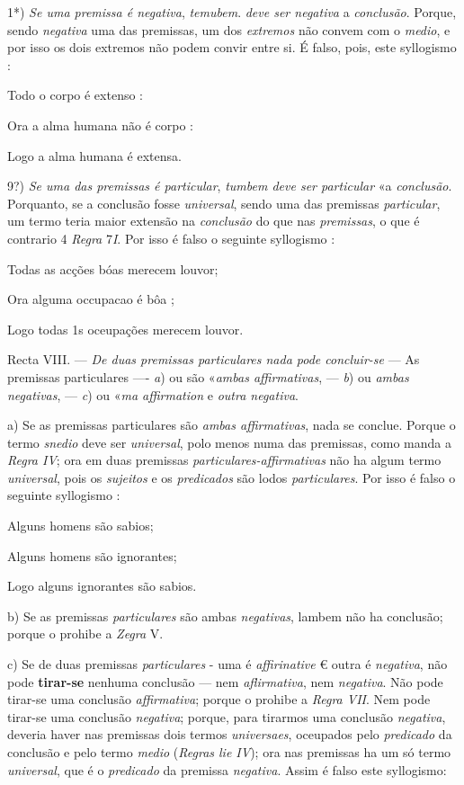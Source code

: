 1*) \emph{Se uma premissa é negativa}, \emph{temubem}. \emph{deve ser negativa} a \emph{conclusão}. Porque, sendo \emph{negativa} uma das premissas, um dos \emph{extremos} não convem com o \emph{medio}, e por isso os dois extremos não podem convir entre si. É falso, pois, este syllogismo :

Todo o corpo é extenso :

Ora a alma humana não é corpo :

Logo a alma humana é extensa.

9?) \emph{Se uma das premissas é particular}, \emph{tumbem deve ser particular} «a \emph{conclusão}. Porquanto, se a conclusão fosse \emph{universal}, sendo uma das premissas \emph{particular}, um termo teria maior extensão na \emph{conclusão} do que nas \emph{premissas}, o que é contrario 4 \emph{Regra} 7\emph{I}. Por isso é falso o seguinte syllogismo :

Todas as acções bóas merecem louvor;

Ora alguma occupacao é bôa ;

Logo todas 1s oceupações merecem louvor.

Recta VIII. --- \emph{De duas premissas particulares nada pode concluir-se} --- As premissas particulares ---- \emph{a}) ou são «\emph{ambas affirmativas}, --- \emph{b}) ou \emph{ambas negativas}, --- \emph{c}) ou «\emph{ma affirmation} e \emph{outra negativa}.

 a) Se as premissas particulares são \emph{ambas affirmativas}, nada se conclue. Porque o termo \emph{snedio} deve ser \emph{universal}, polo menos numa das premissas, como manda a \emph{Regra IV}; ora em duas premissas \emph{particulares-affirmativas} não ha algum termo \emph{universal}, pois os \emph{sujeitos} e os \emph{predicados} são lodos \emph{particulares}. Por isso é falso o seguinte syllogismo :

Alguns homens são sabios;

Alguns homens são ignorantes;

Logo alguns ignorantes são sabios.

b) Se as premissas \emph{particulares} são ambas \emph{negativas}, lambem não ha conclusão; porque o prohibe a \emph{Zegra} V.

c) Se de duas premissas \emph{particulares} - uma é \emph{affirinative} € outra é \emph{negativa}, não pode \textbf{tirar-se} nenhuma conclusão --- nem \emph{aflirmativa}, nem \emph{negativa}. Não pode tirar-se uma conclusão \emph{affirmativa}; porque o prohibe a \emph{Regra VII}. Nem pode tirar-se uma conclusão \emph{negativa}; porque, para tirarmos uma conclusão \emph{negativa}, deveria haver nas premissas dois termos \emph{universaes}, oceupados pelo \emph{predicado} da conclusão e pelo termo \emph{medio} (\emph{Regras lie IV}); ora nas premissas ha um só termo \emph{universal}, que é o \emph{predicado} da premissa \emph{negativa}. Assim é falso este syllogismo:

